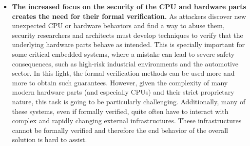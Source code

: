 \begin{itemize}
		\item \textbf{The increased focus on the security of the CPU and hardware parts creates the need for their formal verification.} As attackers discover new unexpected CPU or hardware behaviors and find a way to abuse them, security researchers and architects must develop techniques to verify that the underlying hardware parts behave as intended. This is specially important for some critical embedded systems, where a mistake can lead to severe safety consequences, such as high-risk industrial environments and the automotive sector. In this light, the formal verification methods can be used more and more to obtain such guarantees. However, given the complexity of many modern hardware parts (and especially CPUs) and their strict proprietary nature, this task is going to be particularly challenging. Additionally, many of these systems, even if formally verified, quite often have to interact with complex and rapidly changing external infrastructures. These infrastructures cannot be formally verified and therefore the end behavior of the overall solution is hard to assist.  	
		\end{itemize}
		
		
